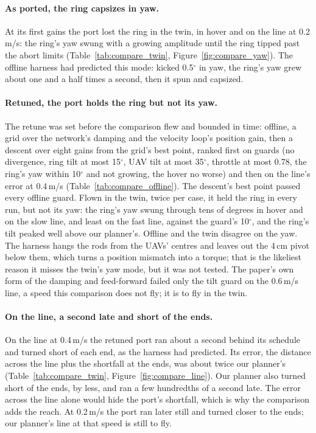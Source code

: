 \paragraph{As ported, the ring capsizes in yaw.} At its first gains the port lost the ring in the twin, in hover and
on the line at 0.2\,m/s: the ring's yaw swung with a growing amplitude until the ring tipped past the abort limits
(Table~\ref{tab:compare_twin}, Figure~\ref{fig:compare_yaw}). The offline harness had predicted this mode: kicked
0.5$^\circ$ in yaw, the ring's yaw grew about one and a half times a second, then it spun and capsized.

\paragraph{Retuned, the port holds the ring but not its yaw.} The retune was set before the comparison flew and
bounded in time: offline, a grid over the network's damping and the velocity loop's position gain, then a descent over
eight gains from the grid's best point, ranked first on guards (no divergence, ring tilt at most 15$^\circ$, UAV tilt at
most 35$^\circ$, throttle at most 0.78, the ring's yaw within 10$^\circ$ and not growing, the hover no worse) and then on
the line's error at 0.4\,m/s (Table~\ref{tab:compare_offline}). The descent's best point passed every offline guard.
Flown in the twin, twice per case, it held the ring in every run, but not its yaw: the ring's yaw swung through tens of
degrees in hover and on the slow line, and least on the fast line, against the guard's 10$^\circ$, and the ring's tilt
peaked well above our planner's. Offline and the twin disagree on the yaw. The harness hangs the
rods from the UAVs' centres and leaves out the 4\,cm pivot below them, which turns a position mismatch into a torque;
that is the likeliest reason it misses the twin's yaw mode, but it was not tested. The paper's own form of the damping
and feed-forward failed only the tilt guard on the 0.6\,m/s line, a speed this comparison does not fly; it is to fly in
the twin.

\paragraph{On the line, a second late and short of the ends.} On the line at 0.4\,m/s the retuned port ran about a
second behind its schedule and turned short of each end, as the harness had predicted. Its error, the distance across
the line plus the shortfall at the ends, was about twice our planner's (Table~\ref{tab:compare_twin},
Figure~\ref{fig:compare_line}). Our planner also turned short of the ends, by less, and ran a few hundredths of a
second late. The error across the line alone would hide the port's shortfall, which is why the comparison adds the
reach. At 0.2\,m/s the port ran later still and turned closer to the ends; our planner's line at that speed is still to
fly.

